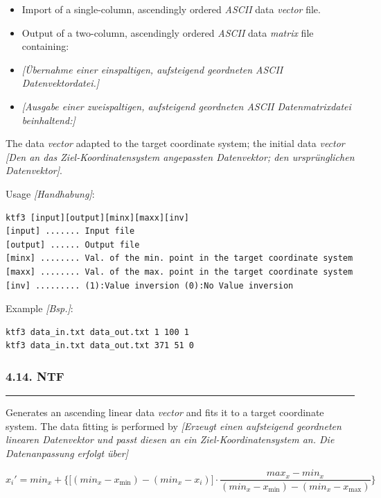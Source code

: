 \documentclass[
]{article}
\begin{document}
\begin{itemize}
\item
  Import of a single-column, ascendingly ordered \emph{ASCII} data
  \emph{vector} file.
\item
  Output of a two-column, ascendingly ordered \emph{ASCII} data
  \emph{matrix} file containing:
\item
  \emph{{[}Übernahme einer einspaltigen, aufsteigend geordneten ASCII
  Datenvektordatei.{]}}
\item
  \emph{{[}Ausgabe einer zweispaltigen, aufsteigend geordneten ASCII
  Datenmatrixdatei beinhaltend:{]}}
\end{itemize}

The data \emph{vector} adapted to the target coordinate system; the
initial data \emph{vector} \emph{{[}Den an das Ziel-Koordinatensystem
angepassten Datenvektor; den ursprünglichen Datenvektor{]}}.

Usage \emph{{[}Handhabung{]}}:

\begin{verbatim}
ktf3 [input][output][minx][maxx][inv] 
[input] ....... Input file 
[output] ...... Output file 
[minx] ........ Val. of the min. point in the target coordinate system
[maxx] ........ Val. of the max. point in the target coordinate system
[inv] ......... (1):Value inversion (0):No Value inversion
\end{verbatim}

Example \emph{{[}Bsp.{]}}:

\begin{verbatim}
ktf3 data_in.txt data_out.txt 1 100 1
ktf3 data_in.txt data_out.txt 371 51 0
\end{verbatim}

\hypertarget{ntf}{%
\subsubsection{4.14. NTF}\label{ntf}}

\begin{center}\rule{0.5\linewidth}{0.5pt}\end{center}

Generates an ascending linear data \emph{vector} and fits it to a target
coordinate system. The data fitting is performed by \emph{{[}Erzeugt
einen aufsteigend geordneten linearen Datenvektor und passt diesen an
ein Ziel-Koordinatensystem an. Die Datenanpassung erfolgt über{]}}

\[x_{i}' = min_{x} + \{\lbrack\left( min_{x} - x_{\min} \right) - \left( min_{x} - x_{i} \right)\rbrack \cdot \frac{max_{x} - min_{x}}{\left( min_{x} - x_{\min} \right) - \left( min_{x} - x_{\max} \right)}\}\]
\end{document}
